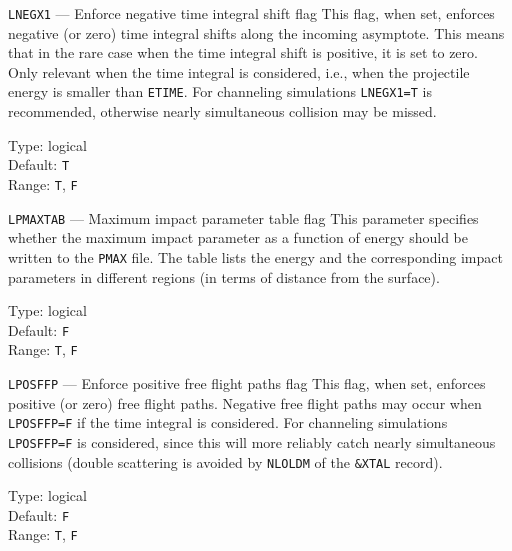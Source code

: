 \begin{keydescription}{\texttt{LNEGX1} --- Enforce negative time integral shift flag}
%
  This flag, when set, enforces negative (or zero) time integral shifts along 
  the incoming asymptote. This means that in the rare case when the time 
  integral shift is positive, it is set to zero. Only relevant when the time 
  integral is considered, i.e., when the projectile energy is smaller than 
  \texttt{ETIME}. For channeling simulations \texttt{LNEGX1=T} is recommended, 
  otherwise nearly simultaneous collision may be missed.
  \begin{keytab}
    Type:    \> logical \\
    Default: \> \texttt{T} \\
    Range:   \> \texttt{T}, \texttt{F}
  \end{keytab}
\end{keydescription}

\begin{keydescription}{\texttt{LPMAXTAB} --- Maximum impact parameter table flag}
%
  This parameter specifies whether the maximum impact parameter as a function 
  of energy should be written to the \texttt{PMAX} file. The table lists the
  energy and the corresponding impact parameters in different regions (in terms
  of distance from the surface).
  \begin{keytab}
    Type:    \> logical \\
    Default: \> \texttt{F} \\
    Range:   \> \texttt{T}, \texttt{F}
  \end{keytab}
\end{keydescription}

\begin{keydescription}{\texttt{LPOSFFP} --- Enforce positive free flight paths flag}
%
  This flag, when set, enforces positive (or zero) free flight paths. Negative 
  free flight paths may occur when \texttt{LPOSFFP=F} if the time integral is 
  considered. For channeling simulations \texttt{LPOSFFP=F} is considered, 
  since this will more reliably catch nearly simultaneous collisions (double 
  scattering is avoided by \texttt{NLOLDM} of the \texttt{\&XTAL} record).
  \begin{keytab}
    Type:    \> logical \\
    Default: \> \texttt{F} \\
    Range:   \> \texttt{T}, \texttt{F}
  \end{keytab}
\end{keydescription}

